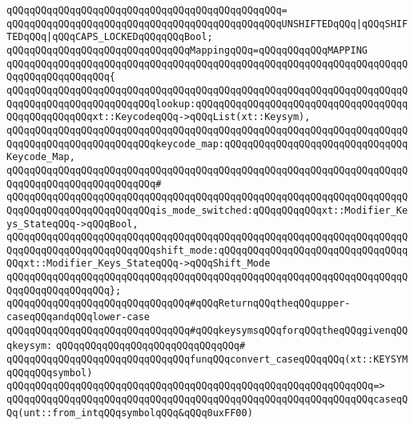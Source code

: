 \verb|qQQqqQQqqQQqqQQqqQQqqQQqqQQqqQQqqQQqqQQqqQQqqQQq=|\newline
\verb|qQQqqQQqqQQqqQQqqQQqqQQqqQQqqQQqqQQqqQQqqQQqqQQqUNSHIFTEDqQQq|\verb#|qQQqSHIFTEDqQQq|qQQqCAPS_LOCKEDqQQqqQQqBool;#\newline
\newline
\newline
\verb|qQQqqQQqqQQqqQQqqQQqqQQqqQQqqQQqMappingqQQq=qQQqqQQqqQQqMAPPING|\newline
\verb|qQQqqQQqqQQqqQQqqQQqqQQqqQQqqQQqqQQqqQQqqQQqqQQqqQQqqQQqqQQqqQQqqQQqqQQqqQQqqQQqqQQqqQQq{|\newline
\verb|qQQqqQQqqQQqqQQqqQQqqQQqqQQqqQQqqQQqqQQqqQQqqQQqqQQqqQQqqQQqqQQqqQQqqQQqqQQqqQQqqQQqqQQqqQQqqQQqlookup:qQQqqQQqqQQqqQQqqQQqqQQqqQQqqQQqqQQqqQQqqQQqqQQqqQQqxt::KeycodeqQQq->qQQqList(xt::Keysym),|\newline
\verb|qQQqqQQqqQQqqQQqqQQqqQQqqQQqqQQqqQQqqQQqqQQqqQQqqQQqqQQqqQQqqQQqqQQqqQQqqQQqqQQqqQQqqQQqqQQqqQQqkeycode_map:qQQqqQQqqQQqqQQqqQQqqQQqqQQqqQQqKeycode_Map,|\newline
\verb|qQQqqQQqqQQqqQQqqQQqqQQqqQQqqQQqqQQqqQQqqQQqqQQqqQQqqQQqqQQqqQQqqQQqqQQqqQQqqQQqqQQqqQQqqQQqqQQq#|\newline
\verb|qQQqqQQqqQQqqQQqqQQqqQQqqQQqqQQqqQQqqQQqqQQqqQQqqQQqqQQqqQQqqQQqqQQqqQQqqQQqqQQqqQQqqQQqqQQqqQQqis_mode_switched:qQQqqQQqqQQqxt::Modifier_Keys_StateqQQq->qQQqBool,|\newline
\verb|qQQqqQQqqQQqqQQqqQQqqQQqqQQqqQQqqQQqqQQqqQQqqQQqqQQqqQQqqQQqqQQqqQQqqQQqqQQqqQQqqQQqqQQqqQQqqQQqshift_mode:qQQqqQQqqQQqqQQqqQQqqQQqqQQqqQQqqQQqxt::Modifier_Keys_StateqQQq->qQQqShift_Mode|\newline
\verb|qQQqqQQqqQQqqQQqqQQqqQQqqQQqqQQqqQQqqQQqqQQqqQQqqQQqqQQqqQQqqQQqqQQqqQQqqQQqqQQqqQQqqQQq};|\newline
\newline
\verb|qQQqqQQqqQQqqQQqqQQqqQQqqQQqqQQq#qQQqReturnqQQqtheqQQqupper-caseqQQqandqQQqlower-case|\newline
\verb|qQQqqQQqqQQqqQQqqQQqqQQqqQQqqQQq#qQQqkeysymsqQQqforqQQqtheqQQqgivenqQQqkeysym:|\newline
\verb|qQQqqQQqqQQqqQQqqQQqqQQqqQQqqQQq#|\newline
\verb|qQQqqQQqqQQqqQQqqQQqqQQqqQQqqQQqfunqQQqconvert_caseqQQqqQQq(xt::KEYSYMqQQqqQQqsymbol)|\newline
\verb|qQQqqQQqqQQqqQQqqQQqqQQqqQQqqQQqqQQqqQQqqQQqqQQqqQQqqQQqqQQqqQQq=>|\newline
\verb|qQQqqQQqqQQqqQQqqQQqqQQqqQQqqQQqqQQqqQQqqQQqqQQqqQQqqQQqqQQqqQQqcaseqQQq(unt::from_intqQQqsymbolqQQq&qQQq0uxFF00)|\newline
